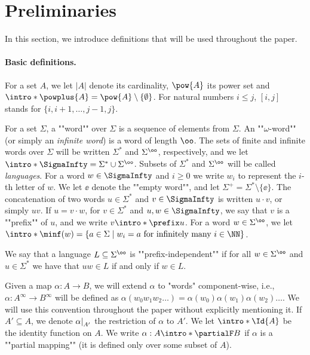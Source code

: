 \documentclass[10pt,a4paper]{amsart}
\newcommand\restr[2]{{%
		\left.\kern-\nulldelimiterspace %
		#1 %
		\littletaller %
		\right|_{#2} %
}}
\newcommand{\littletaller}{\mathchoice{\vphantom{\big|}}{}{}{}}
\renewcommand{\aa}{\alpha}
\renewcommand{\SS}{\Sigma}
\begin{document}
 	
	
	\section{Preliminaries}\label{section:preliminaries}
	In this section, we introduce definitions that will be used throughout the paper.


\paragraph*{Basic definitions.}
\AP For a set $A$, we let $|A|$ denote its cardinality, $\pow{A}$ its power set and $\intro*\powplus{A} = \pow{A} \setminus \{\emptyset\}$.
For natural numbers $i\leq j$, $[i,j]$ stands for $\{i,i+1, \dots, j-1,j \}$.

\AP For a set $\Sigma$, a ""word"" over $\Sigma$ is a sequence of elements from $\Sigma$. 
An ""$\omega$-word"" (or simply an \emph{infinite word}) is a word of length $\oo$.
\AP The sets of finite and infinite words over $\Sigma$ will be written $\Sigma^*$ and $\Sigma^{\oo}$, respectively, 
\AP and we let $\intro*\SigmaInfty = \Sigma^* \cup \Sigma^\oo$. Subsets of $\SS^*$ and $\SS^\oo$ will be called \emph{languages}.  For a word $w\in \SigmaInfty$ and $i\geq 0$ we write $w_i$ to represent the $i$-th letter of $w$.
We let $\ee$ denote the ""empty word"", and let $\SS^+ = \SS^*\setminus\{\ee\}$. The concatenation of two words $u\in \Sigma^*$ and $v\in \SigmaInfty$ is written $u\cdot v$, or simply $uv$. \AP If $u=v\cdot w$, for $v\in \Sigma^*$ and $u,w\in \SigmaInfty$, we say that $v$ is a  ""prefix"" of $u$, and we write $v \intro*\prefix u$. %
\AP For a word $w\in \Sigma^\oo$, we let $\intro*\minf(w)=\{ a\in \Sigma \mid w_i=a \text{ for infinitely many } i\in \NN\}$.

\AP We say that a language $L\subseteq \SS^\oo$ is ""prefix-independent"" if for all $w\in \SS^\oo$ and $u\in \SS^*$ we have that  $uw\in L$ if and only if $w\in L$.

Given a map $\alpha:A \rightarrow B$, we will extend $\alpha$ to "words" component-wise, i.e., $\aa: A^\infty \rightarrow B^\infty$ will be defined as $\aa(w_0w_1w_2\dots)=\aa(w_0)\aa(w_1)\aa(w_2)\dots$. We will use this convention throughout the paper without explicitly mentioning it. 
If $A'\subseteq A$, we denote $\restr{\aa}{A'}$ the restriction of $\aa$ to $A'$.
\AP We let $\intro*\Id{A}$ be the identity function on $A$.
\AP We write $\alpha:A \intro*\partialF B$ if $\aa$ is a ""partial mapping"" (it is defined only over some subset of $A$).
\end{document}
